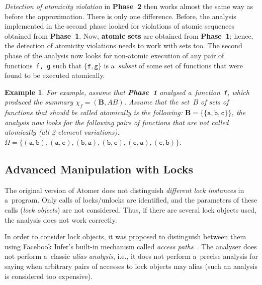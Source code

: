 \documentclass{ExcelAtFIT}
\theoremstyle{example}
\newtheorem{example}{Example}[section]
\begin{document}
\emph{Detection of atomicity violation} in \textbf{Phase~2} then works almost the same way as before the approximation. There is only one difference. Before, the analysis implemented in the second phase looked for violations of atomic sequences obtained from \textbf{Phase~1}. Now, \textbf{atomic sets} are obtained from \textbf{Phase~1}; hence, the detection of atomicity violations needs to work with sets too. The second phase of the analysis now looks for non-atomic execution of any pair of functions~\texttt{f,~g} such that ${ \{\mathtt{f, g}\} }$ is a~\emph{subset} of some set of functions that were found to be executed atomically.

\begin{example}
    \sloppy
    For example, assume that \textbf{Phase~1} analysed a~function~\texttt{f}, which produced the summary $ \chi_f = {(\boldsymbol{B}, AB)} $. Assume that the set~$ B $ of sets of functions that should be called atomically is the following: $ \boldsymbol{B} = \{{\{\mathtt{a}, \mathtt{b}, \mathtt{c}\}}\} $, the analysis now looks for the following pairs of functions that are not called atomically (all 2-element variations): $ \Omega = \{{(\mathtt{a}, \mathtt{b})}, {(\mathtt{a}, \mathtt{c})}, {(\mathtt{b}, \mathtt{a})}, {(\mathtt{b}, \mathtt{c})}, {(\mathtt{c}, \mathtt{a})}, {(\mathtt{c}, \mathtt{b})}\} $.
\end{example}

\subsection{Advanced Manipulation with Locks}

The original version of Atomer does not distinguish \emph{different lock instances} in a~program. Only calls of locks/unlocks are identified, and the parameters of these calls (\emph{lock objects}) are not considered. Thus, if there are several lock objects used, the analysis does not work correctly.

In order to consider lock objects, it was proposed to distinguish between them using Facebook Infer's built-in mechanism called \emph{access paths}~\cite{accessPath}. The analyser does not perform a~classic \emph{alias analysis}, i.e., it does not perform a~precise analysis for saying when arbitrary pairs of accesses to lock objects may alias (such an analysis is considered too expensive).
\end{document}
